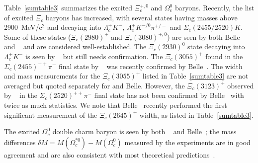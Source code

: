 Table~\ref{sumtable3} summarizes the excited $\Xi_c^{+,0}$ and $\Omega_c^0$ 
baryons. Recently, the list of excited $\Xi_c$ baryons has increased,
with several states having masses above 2900~MeV/c$^2$ and decaying into 
$\Lambda_c^+ K^-$, $\Lambda_c^+ K^{-/0}\pi^{+/-}$ and $\Sigma_c(2455/2520) K$. 
Some of these states ($\Xi_c(2980)^+$ and $\Xi_c(3080)^{+,0}$) are seen by
both Belle~\cite{Chistov:2006zj,YKato:2014} 
and \babar~\cite{Aubert:2007dt} and are considered well-established.
The $\Xi_c(2930)^0$ state decaying into $\Lambda_c^+ K^-$ is seen
by \babar~\cite{Aubert:2007eb} but still needs confirmation.  
The $\Xi_c(3055)^+$ found in the $\Sigma_c(2455)^{++}\pi^-$ final
state by \babar~\cite{Aubert:2007dt} was recently confirmed by
Belle~\cite{YKato:2014}. 
The width and mass measurements for the $\Xi_c(3055)^+$
listed in Table~\ref{sumtable3} 
 are not averaged but quoted separately for \babar and Belle. 
However, the $\Xi_c(3123)^+$ observed by \babar~\cite{Aubert:2007dt}
in the $\Sigma_c(2520)^{++}\pi^-$ final state has not been
confirmed by Belle~\cite{YKato:2014} with twice as much statistics.   
We note that Belle~\cite{YKato:2014} recently performed the first
significant measurement of the $\Xi_c(2645)^+$ width, as listed
in Table~\ref{sumtable3}. 


The excited $\Omega_c^0$ double charm baryon is seen by both 
\babar~\cite{Aubert:2006je} and Belle~\cite{Solovieva:2008fw};
the mass differences $\delta M=M(\Omega_c^{*0})-M(\Omega_c^0)$ 
measured by the experiments are in good agreement
and are also consistent with most theoretical 
predictions~\cite{Rosner:1995yu,Glozman:1995xy,Jenkins:1996de,
Burakovsky:1997vm}. 
   

